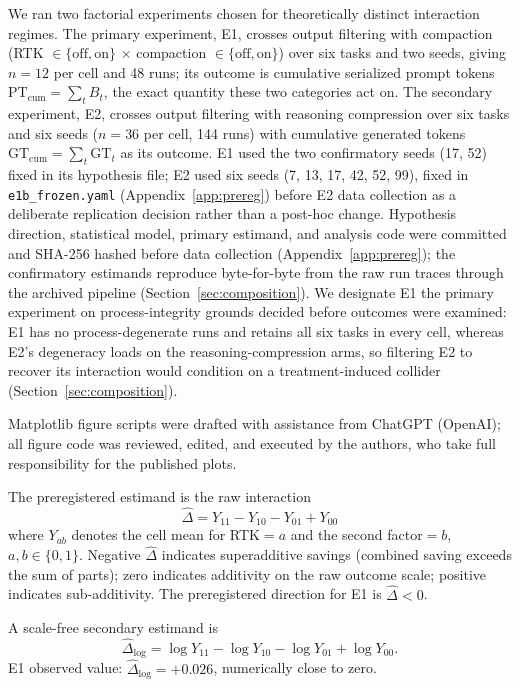 \documentclass{article}
\begin{document}
We ran two factorial experiments chosen for theoretically distinct interaction regimes. The primary experiment, E1, crosses output filtering with compaction (RTK $\in\{\text{off},\text{on}\}$ $\times$ compaction $\in\{\text{off},\text{on}\}$) over six tasks and two seeds, giving $n=12$ per cell and 48 runs; its outcome is cumulative serialized prompt tokens $\mathrm{PT}_{\mathrm{cum}}=\sum_t B_t$, the exact quantity these two categories act on. The secondary experiment, E2, crosses output filtering with reasoning compression over six tasks and six seeds ($n=36$ per cell, 144 runs) with cumulative generated tokens $\mathrm{GT}_{\mathrm{cum}}=\sum_t \mathrm{GT}_t$ as its outcome. E1 used the two confirmatory seeds (17, 52) fixed in its hypothesis file; E2 used six seeds (7, 13, 17, 42, 52, 99), fixed in \texttt{e1b\_frozen.yaml} (Appendix~\ref{app:prereg}) before E2 data collection as a deliberate replication decision rather than a post-hoc change. Hypothesis direction, statistical model, primary estimand, and analysis code were committed and SHA-256 hashed before data collection (Appendix~\ref{app:prereg}); the confirmatory estimands reproduce byte-for-byte from the raw run traces through the archived pipeline (Section~\ref{sec:composition}). We designate E1 the primary experiment on process-integrity grounds decided before outcomes were examined: E1 has no process-degenerate runs and retains all six tasks in every cell, whereas E2's degeneracy loads on the reasoning-compression arms, so filtering E2 to recover its interaction would condition on a treatment-induced collider (Section~\ref{sec:composition}).

Matplotlib figure scripts were drafted with assistance from ChatGPT (OpenAI); all figure code was reviewed, edited, and executed by the authors, who take full responsibility for the published plots.

The preregistered estimand is the raw interaction
\begin{equation}
  \hat{\Delta} = Y_{11} - Y_{10} - Y_{01} + Y_{00}
  \label{eq:interaction}
\end{equation}
where $Y_{ab}$ denotes the cell mean for RTK$=a$ and the second factor$=b$, $a,b\in\{0,1\}$. Negative $\hat{\Delta}$ indicates superadditive savings (combined saving exceeds the sum of parts); zero indicates additivity on the raw outcome scale; positive indicates sub-additivity. The preregistered direction for E1 is $\hat{\Delta}<0$.

A scale-free secondary estimand is
\begin{equation}
  \hat{\Delta}_{\log} = \log Y_{11} - \log Y_{10} - \log Y_{01} + \log Y_{00}.
  \label{eq:log_interaction}
\end{equation}
E1 observed value: $\hat{\Delta}_{\log}=+0.026$, numerically close to zero.
\end{document}
